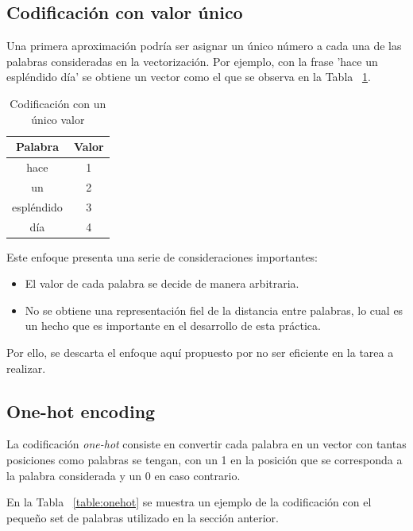 \documentclass[12pt,a4paper, xcolor=table]{article}
\begin{document}
\subsection{Codificación con valor único}
Una primera aproximación podría ser asignar un único número a cada una de las palabras consideradas en la vectorización. Por ejemplo, con la frase 'hace un espléndido día' se obtiene un vector como el que se observa en la Tabla ~\ref{table:unico}.

      \begin{table}[h]
        \centering
        \begin{tabular}{|c|c|}
        \hline
        \rowcolor[HTML]{DAE8FC}
        \textbf{Palabra} & \textbf{Valor} \\ \hline
        hace                    & 1   \\ \hline
        un                     & 2   \\ \hline
        espléndido                     & 3  \\ \hline
        día                       & 4   \\ \hline
        \end{tabular}
        \caption{Codificación con un único valor}
        \label{table:unico}
    \end{table}

Este enfoque presenta una serie de consideraciones importantes:
\begin{itemize}
\item El valor de cada palabra se decide de manera arbitraria.
\item No se obtiene una representación fiel de la distancia entre palabras, lo cual es un hecho que es importante en el desarrollo de esta práctica.
\end{itemize}

Por ello, se descarta el enfoque aquí propuesto por no ser eficiente en la tarea a realizar.

\subsection{One-hot encoding}
La codificación \textit{one-hot} consiste en convertir cada palabra en un vector con tantas posiciones como palabras se tengan, con un 1 en la posición que se corresponda a la palabra considerada y un 0 en caso contrario.


\vspace{2mm}

En la Tabla ~\ref{table:onehot} se muestra un ejemplo de la codificación con el pequeño set de palabras utilizado en la sección anterior.
\end{document}

